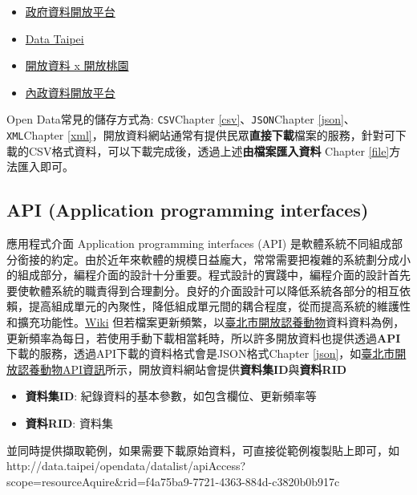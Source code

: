 \documentclass[]{book}
\providecommand{\tightlist}{%
  \setlength{\itemsep}{0pt}\setlength{\parskip}{0pt}}
\theoremstyle{definition}
\theoremstyle{definition}
\theoremstyle{remark}
\begin{document}
\begin{itemize}
\tightlist
\item
  \href{http://data.gov.tw/}{政府資料開放平台}
\item
  \href{http://data.taipei/}{Data Taipei}
\item
  \href{http://data.tycg.gov.tw/}{開放資料 x 開放桃園}
\item
  \href{http://data.moi.gov.tw/}{內政資料開放平台}
\end{itemize}

Open Data常見的儲存方式為: \texttt{CSV}Chapter
\ref{csv}、\texttt{JSON}Chapter \ref{json}、\texttt{XML}Chapter
\ref{xml}，開放資料網站通常有提供民眾\textbf{直接下載}檔案的服務，針對可下載的CSV格式資料，可以下載完成後，透過上述\textbf{由檔案匯入資料}
Chapter \ref{file}方法匯入即可。

\subsection{API (Application programming interfaces)}\label{api}

應用程式介面 Application programming interfaces (API)
是軟體系統不同組成部分銜接的約定。由於近年來軟體的規模日益龐大，常常需要把複雜的系統劃分成小的組成部分，編程介面的設計十分重要。程式設計的實踐中，編程介面的設計首先要使軟體系統的職責得到合理劃分。良好的介面設計可以降低系統各部分的相互依賴，提高組成單元的內聚性，降低組成單元間的耦合程度，從而提高系統的維護性和擴充功能性。\href{https://zh.wikipedia.org/zh-tw/\%E5\%BA\%94\%E7\%94\%A8\%E7\%A8\%8B\%E5\%BA\%8F\%E6\%8E\%A5\%E5\%8F\%A3}{Wiki}
但若檔案更新頻繁，以\href{http://data.taipei/opendata/datalist/datasetMeta?oid=6a3e862a-e1cb-4e44-b989-d35609559463}{臺北市開放認養動物}資料資料為例，更新頻率為每日，若使用手動下載相當耗時，所以許多開放資料也提供透過\textbf{API}下載的服務，透過API下載的資料格式會是JSON格式Chapter
\ref{json}，如\href{http://data.taipei/opendata/datalist/datasetMeta/outboundDesc?id=6a3e862a-e1cb-4e44-b989-d35609559463\&rid=f4a75ba9-7721-4363-884d-c3820b0b917c}{臺北市開放認養動物API資訊}所示，開放資料網站會提供\textbf{資料集ID}與\textbf{資料RID}

\begin{itemize}
\tightlist
\item
  \textbf{資料集ID}: 紀錄資料的基本參數，如包含欄位、更新頻率等
\item
  \textbf{資料RID}: 資料集
\end{itemize}

並同時提供擷取範例，如果需要下載原始資料，可直接從範例複製貼上即可，如http://data.taipei/opendata/datalist/apiAccess?scope=resourceAquire\&rid=f4a75ba9-7721-4363-884d-c3820b0b917c
\end{document}
